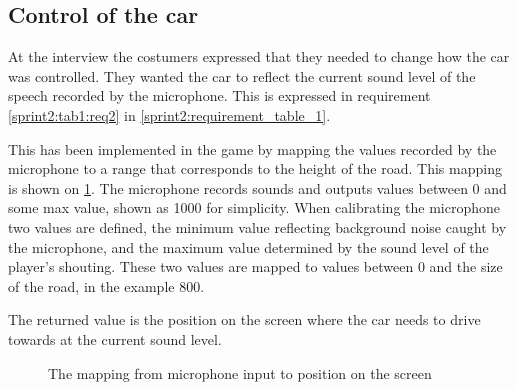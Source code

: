 \subsection{Control of the car}
At the interview the costumers expressed that they needed to change how the car was controlled.
They wanted the car to reflect the current sound level of the speech recorded by the microphone.
This is expressed in requirement \ref{sprint2:tab1:req2} in \cref{sprint2:requirement_table_1}.

This has been implemented in the game by mapping the values recorded by the microphone to a range that corresponds to the height of the road.
This mapping is shown on \cref{mapping}.
The microphone records sounds and outputs values between 0 and some max value, shown as 1000 for simplicity.
When calibrating the microphone two values are defined, the minimum value reflecting background noise caught by the microphone, and the maximum value determined by the sound level of the player's shouting.
These two values are mapped to values between 0 and the size of the road, in the example 800.

The returned value is the position on the screen where the car needs to drive towards at the current sound level.

\begin{figure}
\centering

\caption{The mapping from microphone input to position on the screen}
\label{mapping}
\end{figure}


